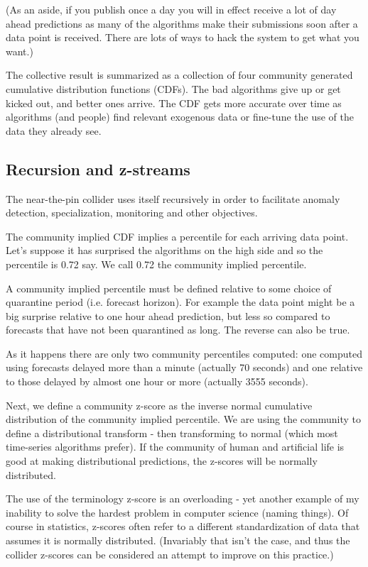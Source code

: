 (As an aside, if you publish once a day you will in effect receive a lot of day ahead predictions as many of the algorithms make their submissions soon after a data point is received. There are lots of ways to hack the system to get what you want.)

The collective result is summarized as a collection of four community generated cumulative distribution functions (CDFs). The bad algorithms give up or get kicked out, and better ones arrive. The CDF gets more accurate over time as algorithms (and people) find relevant exogenous data or fine-tune the use of the data they already see. 

\subsection{Recursion and z-streams}

The near-the-pin collider uses itself recursively in order to facilitate anomaly detection, specialization, monitoring and other objectives. 

The community implied CDF implies a percentile for each arriving data point. Let's suppose it has surprised the algorithms on the high side and so the percentile is 0.72 say. We call 0.72 the community implied percentile.

A community implied percentile must be defined relative to some choice of quarantine period (i.e. forecast horizon). For example the data point might be a big surprise relative to one hour ahead prediction, but less so compared to forecasts that have not been quarantined as long. The reverse can also be true. 

As it happens there are only two community percentiles computed: one computed using forecasts delayed more than a minute (actually 70 seconds) and one relative to those delayed by almost one hour or more (actually 3555 seconds).

Next, we define a community z-score as the inverse normal cumulative distribution of the community implied percentile. We are using the community to define a distributional transform - then transforming to normal (which most time-series algorithms prefer). If the community of human and artificial life is good at making distributional predictions, the z-scores will be normally distributed.

The use of the terminology z-score is an overloading - yet another example of my inability to solve the hardest problem in computer science (naming things). Of course in statistics, z-scores often refer to a different standardization of data that assumes it is normally distributed. (Invariably that isn't the case, and thus the collider z-scores can be considered an attempt to improve on this practice.) 

